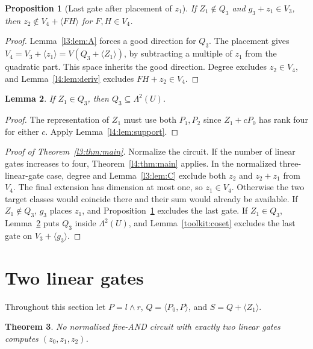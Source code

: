 \documentclass[11pt,a4paper]{article}
\theoremstyle{plain}
\newtheorem{theorem}{Theorem}
\newtheorem{lemma}[theorem]{Lemma}
\newtheorem{proposition}[theorem]{Proposition}
\theoremstyle{remark}
\theoremstyle{plain}
\begin{document}
\begin{proposition}[Last gate after placement of $z_1$]\label{l3:prop:B}
If $Z_1\notin Q_3$ and $g_3+z_1\in V_3$, then $z_2\notin V_4+\langle FH\rangle$ for $F,H\in V_4$.
\end{proposition}
\begin{proof}
Lemma~\ref{l3:lem:A} forces a good direction for $Q_3$. The placement gives $V_4=V_3+\langle z_1\rangle=V(Q_3+\langle Z_1\rangle)$, by subtracting a multiple of $z_1$ from the quadratic part. This space inherits the good direction. Degree excludes $z_2\in V_4$, and Lemma~\ref{l4:lem:deriv} excludes $FH+z_2\in V_4$.
\end{proof}

\begin{lemma}\label{l3:lem:B3U}
If $Z_1\in Q_3$, then $Q_3\subseteq\Lambda^2(U)$.
\end{lemma}
\begin{proof}
The representation of $Z_1$ must use both $P_1,P_2$ since $Z_1+cP_0$ has rank four for either $c$. Apply Lemma~\ref{l4:lem:support}.
\end{proof}

\begin{proof}[Proof of Theorem~\ref{l3:thm:main}]
Normalize the circuit. If the number of linear gates increases to four, Theorem~\ref{l4:thm:main} applies. In the normalized three-linear-gate case, degree and Lemma~\ref{l3:lem:C} exclude both $z_2$ and $z_2+z_1$ from $V_4$. The final extension has dimension at most one, so $z_1\in V_4$. Otherwise the two target classes would coincide there and their sum would already be available. If $Z_1\notin Q_3$, $g_3$ places $z_1$, and Proposition~\ref{l3:prop:B} excludes the last gate. If $Z_1\in Q_3$, Lemma~\ref{l3:lem:B3U} puts $Q_3$ inside $\Lambda^2(U)$, and Lemma~\ref{toolkit:coset} excludes the last gate on $V_3+\langle g_3\rangle$.
\end{proof}


\section{Two linear gates}\label{sec:lambda2}
Throughout this section let $P=l\wedge r$, $Q=\langle P_0,P\rangle$, and $S=Q+\langle Z_1\rangle$.

\begin{theorem}\label{l2:thm:main}
No normalized five-AND circuit with exactly two linear gates computes $(z_0,z_1,z_2)$.
\end{theorem}
\end{document}
